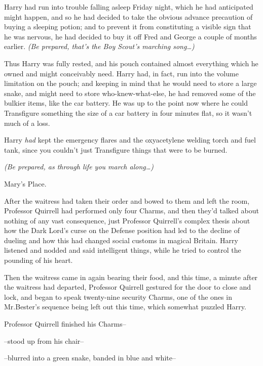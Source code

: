

\hplettrineextrapara
Harry had run into trouble falling asleep Friday night, which he had anticipated might happen, and so he had decided to take the obvious advance precaution of buying a sleeping potion; and to prevent it from constituting a visible sign that he was nervous, he had decided to buy it off Fred and George a couple of months earlier. \emph{(Be prepared, that's the Boy Scout's marching song{\ldots})}

Thus Harry was fully rested, and his pouch contained almost everything which he owned and might conceivably need. Harry had, in fact, run into the volume limitation on the pouch; and keeping in mind that he would need to store a large snake, and might need to store who-knew-what-else, he had removed some of the bulkier items, like the car battery. He was up to the point now where he could Transfigure something the size of a car battery in four minutes flat, so it wasn't much of a loss.

Harry \emph{had} kept the emergency flares and the oxyacetylene welding torch and fuel tank, since you couldn't just Transfigure things that were to be burned.

\emph{(Be prepared, as through life you march along{\ldots})}

Mary's Place.

After the waitress had taken their order and bowed to them and left the room, Professor Quirrell had performed only four Charms, and then they'd talked about nothing of any vast consequence, just Professor Quirrell's complex thesis about how the Dark Lord's curse on the Defense position had led to the decline of dueling and how this had changed social customs in magical Britain. Harry listened and nodded and said intelligent things, while he tried to control the pounding of his heart.

Then the waitress came in again bearing their food, and this time, a minute after the waitress had departed, Professor Quirrell gestured for the door to close and lock, and began to speak twenty-nine security Charms, one of the ones in Mr.\?Bester's sequence being left out this time, which somewhat puzzled Harry.

Professor Quirrell finished his Charms\---

\---stood up from his chair\---

\---blurred into a green snake, banded in blue and white\---

